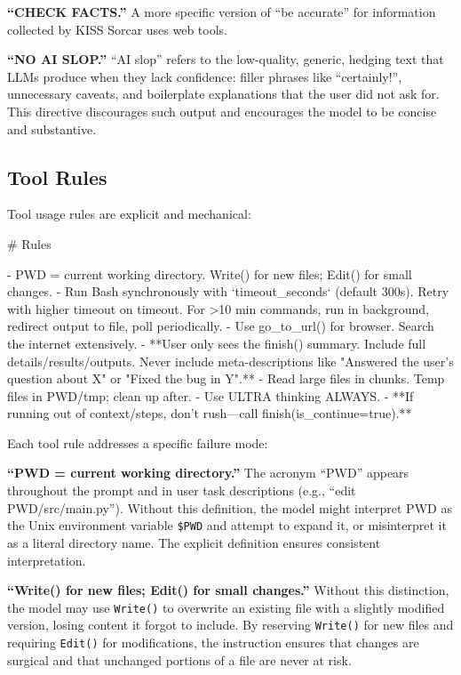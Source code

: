 \documentclass{article}
\begin{document}
\textbf{``CHECK FACTS.''} A more specific version of ``be accurate'' for information collected by KISS Sorcar uses web tools.

\textbf{``NO AI SLOP.''} ``AI slop'' refers to the low-quality, generic, hedging text that LLMs produce when they lack confidence: filler phrases like ``certainly!'', unnecessary caveats, and boilerplate explanations that the user did not ask for.  This directive discourages such output and encourages the model to be concise and substantive.

\subsection{Tool Rules}

Tool usage rules are explicit and mechanical:

\begin{prompt}
# Rules

- PWD = current working directory. Write() for new files; Edit() for small changes.
- Run Bash synchronously with `timeout_seconds` (default 300s). Retry with higher timeout on timeout. For >10 min commands, run in background, redirect output to file, poll periodically.
- Use go_to_url() for browser. Search the internet extensively.
- **User only sees the finish() summary. Include full details/results/outputs. Never include meta-descriptions like "Answered the user's question about X" or "Fixed the bug in Y".**
- Read large files in chunks. Temp files in PWD/tmp; clean up after.
- Use ULTRA thinking ALWAYS.
- **If running out of context/steps, don't rush---call finish(is_continue=true).**
\end{prompt}

Each tool rule addresses a specific failure mode:

\textbf{``PWD = current working directory.''}  The acronym ``PWD'' appears throughout the prompt and in user task descriptions (e.g., ``edit PWD/src/main.py'').  Without this definition, the model might interpret PWD as the Unix environment variable \texttt{\$PWD} and attempt to expand it, or misinterpret it as a literal directory name.  The explicit definition ensures consistent interpretation.

\textbf{``Write() for new files; Edit() for small changes.''}  Without this distinction, the model may use \texttt{Write()} to overwrite an existing file with a slightly modified version, losing content it forgot to include.  By reserving \texttt{Write()} for new files and requiring \texttt{Edit()} for modifications, the instruction ensures that changes are surgical and that unchanged portions of a file are never at risk.
\end{document}
